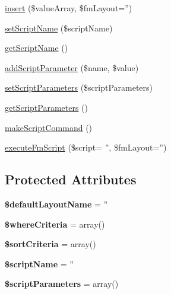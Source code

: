 \begin{DoxyCompactItemize}
\hyperlink{classrjakes_1_1_rjakes_simple_f_m_1_1_facade_af94c0a2c011aed68ee16e4d5d1bacd57}{insert} (\$value\+Array, \$fm\+Layout='')
\item 
\hyperlink{classrjakes_1_1_rjakes_simple_f_m_1_1_facade_af45812e24c97634b10726423d9571bb5}{set\+Script\+Name} (\$script\+Name)
\item 
\hyperlink{classrjakes_1_1_rjakes_simple_f_m_1_1_facade_a8fddbb7824b34991274f7a3e1211f556}{get\+Script\+Name} ()
\item 
\hyperlink{classrjakes_1_1_rjakes_simple_f_m_1_1_facade_adf0e446c1766376d4e96b4c1e88ef092}{add\+Script\+Parameter} (\$name, \$value)
\item 
\hyperlink{classrjakes_1_1_rjakes_simple_f_m_1_1_facade_a46f7aea523e355126fcbdf6d73832341}{set\+Script\+Parameters} (\$script\+Parameters)
\item 
\hyperlink{classrjakes_1_1_rjakes_simple_f_m_1_1_facade_aaa54c2015868fd4268d2c67afffbbd23}{get\+Script\+Parameters} ()
\item 
\hyperlink{classrjakes_1_1_rjakes_simple_f_m_1_1_facade_aca005e47f884207d90f84fb9461dc5bb}{make\+Script\+Command} ()
\item 
\hyperlink{classrjakes_1_1_rjakes_simple_f_m_1_1_facade_a641a0b194ef0f1f5ec42ef7f41bb4447}{execute\+Fm\+Script} (\$script= '', \$fm\+Layout='')
\end{DoxyCompactItemize}
\subsection*{Protected Attributes}
\begin{DoxyCompactItemize}
\item 
\hypertarget{classrjakes_1_1_rjakes_simple_f_m_1_1_facade_acee9fef38dab29dc51d335ce0d3bb12f}{{\bfseries \$default\+Layout\+Name} = ''}\label{classrjakes_1_1_rjakes_simple_f_m_1_1_facade_acee9fef38dab29dc51d335ce0d3bb12f}

\item 
\hypertarget{classrjakes_1_1_rjakes_simple_f_m_1_1_facade_ac80a8ebff266cd68c5d4f5735335109f}{{\bfseries \$where\+Criteria} = array()}\label{classrjakes_1_1_rjakes_simple_f_m_1_1_facade_ac80a8ebff266cd68c5d4f5735335109f}

\item 
\hypertarget{classrjakes_1_1_rjakes_simple_f_m_1_1_facade_a5d7448ed2dd9d65e98b922cc4c686234}{{\bfseries \$sort\+Criteria} = array()}\label{classrjakes_1_1_rjakes_simple_f_m_1_1_facade_a5d7448ed2dd9d65e98b922cc4c686234}

\item 
\hypertarget{classrjakes_1_1_rjakes_simple_f_m_1_1_facade_a7dccab22d88281f5f621207815521b79}{{\bfseries \$script\+Name} = ''}\label{classrjakes_1_1_rjakes_simple_f_m_1_1_facade_a7dccab22d88281f5f621207815521b79}

\item 
\hypertarget{classrjakes_1_1_rjakes_simple_f_m_1_1_facade_ac9f0bb23ade1512d0f500c4fc55a4dda}{{\bfseries \$script\+Parameters} = array()}\label{classrjakes_1_1_rjakes_simple_f_m_1_1_facade_ac9f0bb23ade1512d0f500c4fc55a4dda}

\end{DoxyCompactItemize}


